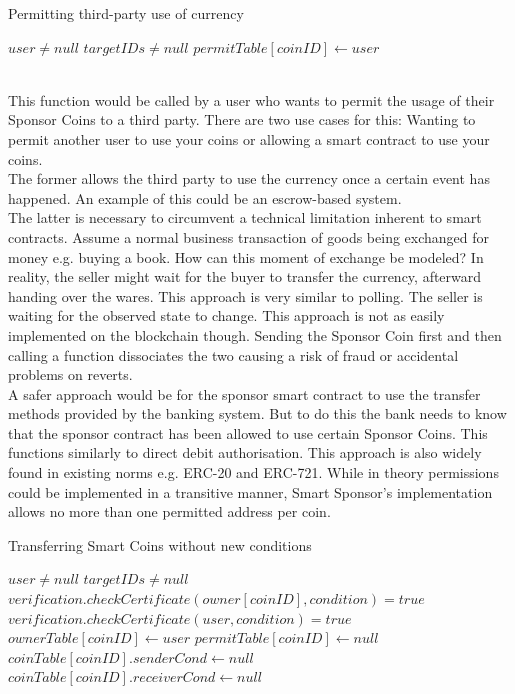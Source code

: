 \begin{algorithm}
\caption{Permitting third-party use of currency}\label{alg:permit}
\begin{algorithmic}
\Require $user \neq null$
\Require $targetIDs \neq null$
\State $permitTable[coinID] \gets user$
\EndIf
\EndFor
\end{algorithmic}
\end{algorithm}
\\
This function would be called by a user who wants to permit the usage of their Sponsor Coins to a third party. There are two use cases for this: Wanting to permit another user to use your coins or allowing a smart contract to use your coins.\\
The former allows the third party to use the currency once a certain event has happened. An example of this could be an escrow-based system.\\
The latter is necessary to circumvent a technical limitation inherent to smart contracts. Assume a normal business transaction of goods being exchanged for money e.g. buying a book. How can this moment of exchange be modeled? In reality, the seller might wait for the buyer to transfer the currency, afterward handing over the wares. This approach is very similar to polling. The seller is waiting for the observed state to change. This approach is not as easily implemented on the blockchain though. Sending the Sponsor Coin first and then calling a function dissociates the two causing a risk of fraud or accidental problems on reverts.\\
A safer approach would be for the sponsor smart contract to use the transfer methods provided by the banking system. But to do this the bank needs to know that the sponsor contract has been allowed to use certain Sponsor Coins. This functions similarly to direct debit authorisation. This approach is also widely found in existing norms e.g. ERC-20 and ERC-721. While in theory permissions could be implemented in a transitive manner, Smart Sponsor's implementation allows no more than one permitted address per coin.\\
\begin{algorithm}
\caption{Transferring Smart Coins without new conditions}\label{alg:normal}
\begin{algorithmic}[1]
\Require $user \neq null$
\Require $targetIDs \neq null$
\Ensure $verification.checkCertificate(owner[coinID], condition) = true$
\EndFor
{}
\Ensure $verification.checkCertificate(user, condition) = true$
\EndFor
\State $ownerTable[coinID] \gets user$
\State $permitTable[coinID] \gets null$
\State $coinTable[coinID].senderCond \gets null$
\State $coinTable[coinID].receiverCond \gets null$
\EndIf
\EndFor
\end{algorithmic}
\end{algorithm}
